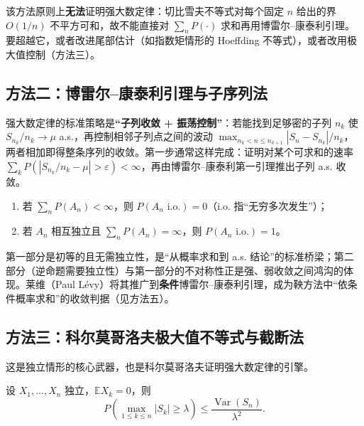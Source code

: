 \begin{remark}
    该方法原则上\textbf{无法}证明强大数定律：切比雪夫不等式对每个固定 $n$ 给出的界 $O(1/n)$ 不平方可和，故不能直接对 $\sum_n P(\cdot)$ 求和再用博雷尔--康泰利引理。要超越它，或者改进尾部估计（如指数矩情形的 Hoeffding 不等式\cite{hoeffding1963}），或者改用极大值控制（方法三）。
\end{remark}

\subsection{方法二：博雷尔--康泰利引理与子序列法}

强大数定律的标准策略是\textbf{“子列收敛 + 振荡控制”}：若能找到足够密的子列 $n_k$ 使 $S_{n_k}/n_k \to \mu$ a.s.，再控制相邻子列点之间的波动 $\max_{n_k < n \leq n_{k+1}} |S_n - S_{n_k}|/n_k$，两者相加即得整条序列的收敛。第一步通常这样完成：证明对某个可求和的速率 $\sum_k P(|S_{n_k}/n_k - \mu| > \varepsilon) < \infty$，再由博雷尔--康泰利第一引理推出子列 a.s. 收敛。

\begin{theorem}\label{thm:bc}
    \begin{enumerate}[label=(\arabic*)]
        \item 若 $\sum_{n} P(A_n) < \infty$，则 $P(A_n \text{ i.o.}) = 0$（i.o. 指“无穷多次发生”）；
        \item 若 $A_n$ 相互独立且 $\sum_n P(A_n) = \infty$，则 $P(A_n \text{ i.o.}) = 1$。
    \end{enumerate}
\end{theorem}

第一部分是初等的且无需独立性，是“从概率求和到 a.s. 结论”的标准桥梁；第二部分（逆命题需要独立性）与第一部分的不对称性正是强、弱收敛之间鸿沟的体现。莱维（Paul L\'evy）将其推广到\textbf{条件}博雷尔--康泰利引理，成为鞅方法中“依条件概率求和”的收敛判据（见方法五）。

\subsection{方法三：科尔莫哥洛夫极大值不等式与截断法}

这是独立情形的核心武器，也是科尔莫哥洛夫证明强大数定律的引擎。

\begin{theorem}[科尔莫哥洛夫极大值不等式]\label{thm:kolmogorov-ineq}
    设 $X_1, \dots, X_n$ 独立，$\mathbb{E}X_k = 0$，则
    \begin{equation}
        P\left(\max_{1 \leq k \leq n} |S_k| \geq \lambda\right) \leq \frac{\operatorname{Var}(S_n)}{\lambda^2}.
    \end{equation}
\end{theorem}

